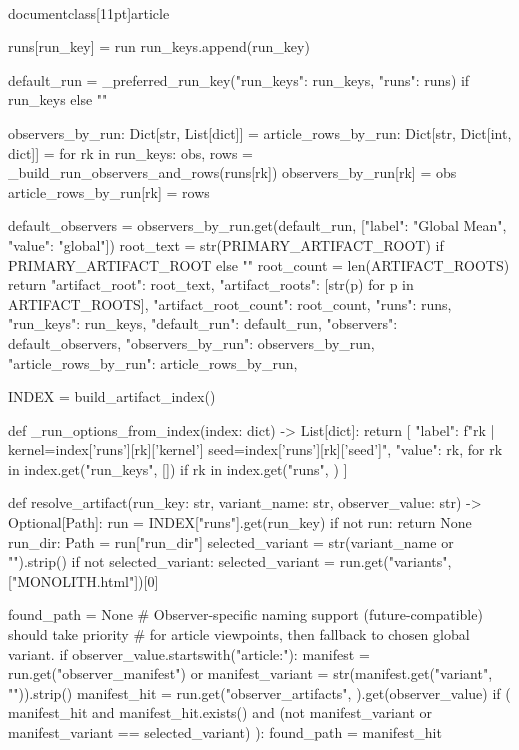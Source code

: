 \\documentclass[11pt]{article}
\begin{document}
\begin{CodeBlock}
{        runs[run_key] = run
        run_keys.append(run_key)

    default_run = _preferred_run_key({"run_keys": run_keys, "runs": runs}) if run_keys else ""

    observers_by_run: Dict[str, List[dict]] = {}
    article_rows_by_run: Dict[str, Dict[int, dict]] = {}
    for rk in run_keys:
        obs, rows = _build_run_observers_and_rows(runs[rk])
        observers_by_run[rk] = obs
        article_rows_by_run[rk] = rows

    default_observers = observers_by_run.get(default_run, [{"label": "Global Mean", "value": "global"}])
    root_text = str(PRIMARY_ARTIFACT_ROOT) if PRIMARY_ARTIFACT_ROOT else ""
    root_count = len(ARTIFACT_ROOTS)
    return {
        "artifact_root": root_text,
        "artifact_roots": [str(p) for p in ARTIFACT_ROOTS],
        "artifact_root_count": root_count,
        "runs": runs,
        "run_keys": run_keys,
        "default_run": default_run,
        "observers": default_observers,
        "observers_by_run": observers_by_run,
        "article_rows_by_run": article_rows_by_run,
    }


INDEX = build_artifact_index()


def _run_options_from_index(index: dict) -> List[dict]:
    return [
        {
            "label": f"{rk} | kernel={index['runs'][rk]['kernel']} seed={index['runs'][rk]['seed']}",
            "value": rk,
        }
        for rk in index.get("run_keys", [])
        if rk in index.get("runs", {})
    ]


def resolve_artifact(run_key: str, variant_name: str, observer_value: str) -> Optional[Path]:
    run = INDEX["runs"].get(run_key)
    if not run:
        return None
    run_dir: Path = run["run_dir"]
    selected_variant = str(variant_name or "").strip()
    if not selected_variant:
        selected_variant = run.get("variants", ["MONOLITH.html"])[0]
    
    found_path = None
    # Observer-specific naming support (future-compatible) should take priority
    # for article viewpoints, then fallback to chosen global variant.
    if observer_value.startswith("article:"):
        manifest = run.get("observer_manifest") or {}
        manifest_variant = str(manifest.get("variant", "")).strip()
        manifest_hit = run.get("observer_artifacts", {}).get(observer_value)
        if (
            manifest_hit
            and manifest_hit.exists()
            and (not manifest_variant or manifest_variant == selected_variant)
        ):
            found_path = manifest_hit

}
\end{CodeBlock}
\end{document}
